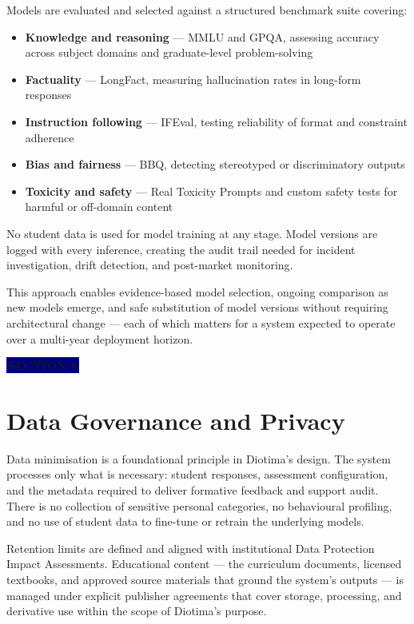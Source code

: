 \documentclass[11pt, a4paper]{article}
\newcommand{\sectiontag}[1]{%
  \vspace{4pt}%
  {\color{white}\colorbox{navy}{\small\bfseries\,#1\,}}%
  \vspace{6pt}%
}
\begin{document}
Models are evaluated and selected against a structured benchmark suite covering:

\begin{itemize}
  \item \textbf{Knowledge and reasoning} --- MMLU and GPQA, assessing accuracy across subject domains and graduate-level problem-solving
  \item \textbf{Factuality} --- LongFact, measuring hallucination rates in long-form responses
  \item \textbf{Instruction following} --- IFEval, testing reliability of format and constraint adherence
  \item \textbf{Bias and fairness} --- BBQ, detecting stereotyped or discriminatory outputs
  \item \textbf{Toxicity and safety} --- Real Toxicity Prompts and custom safety tests for harmful or off-domain content
\end{itemize}

No student data is used for model training at any stage. Model versions are logged with every inference, creating the audit trail needed for incident investigation, drift detection, and post-market monitoring.

This approach enables evidence-based model selection, ongoing comparison as new models emerge, and safe substitution of model versions without requiring architectural change --- each of which matters for a system expected to operate over a multi-year deployment horizon.

\sectiontag{SECTION 8}

\section{Data Governance and Privacy}

Data minimisation is a foundational principle in Diotima's design. The system processes only what is necessary: student responses, assessment configuration, and the metadata required to deliver formative feedback and support audit. There is no collection of sensitive personal categories, no behavioural profiling, and no use of student data to fine-tune or retrain the underlying models.

Retention limits are defined and aligned with institutional Data Protection Impact Assessments. Educational content --- the curriculum documents, licensed textbooks, and approved source materials that ground the system's outputs --- is managed under explicit publisher agreements that cover storage, processing, and derivative use within the scope of Diotima's purpose.
\end{document}
